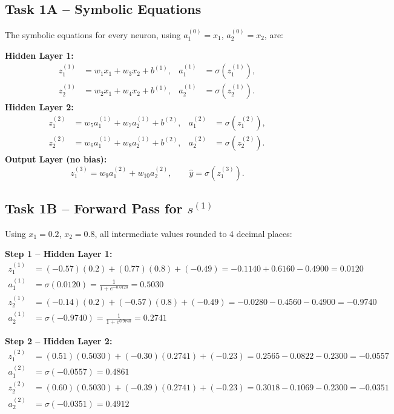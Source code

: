 \documentclass[runningheads]{llncs}
\begin{document}
\subsection{Task 1A -- Symbolic Equations}

The symbolic equations for every neuron, using $a_1^{(0)}=x_1$,
$a_2^{(0)}=x_2$, are:

\noindent\textbf{Hidden Layer 1:}
\begin{align*}
  z_1^{(1)} &= w_1 x_1 + w_3 x_2 + b^{(1)}, & a_1^{(1)} &= \sigma(z_1^{(1)}),\\
  z_2^{(1)} &= w_2 x_1 + w_4 x_2 + b^{(1)}, & a_2^{(1)} &= \sigma(z_2^{(1)}).
\end{align*}
\textbf{Hidden Layer 2:}
\begin{align*}
  z_1^{(2)} &= w_5 a_1^{(1)} + w_7 a_2^{(1)} + b^{(2)}, & a_1^{(2)} &= \sigma(z_1^{(2)}),\\
  z_2^{(2)} &= w_6 a_1^{(1)} + w_8 a_2^{(1)} + b^{(2)}, & a_2^{(2)} &= \sigma(z_2^{(2)}).
\end{align*}
\textbf{Output Layer (no bias):}
\begin{equation*}
  z_1^{(3)} = w_9 a_1^{(2)} + w_{10} a_2^{(2)}, \qquad \hat{y} = \sigma(z_1^{(3)}).
\end{equation*}

\subsection{Task 1B -- Forward Pass for $s^{(1)}$}

Using $x_1=0.2$, $x_2=0.8$, all intermediate values rounded to 4 decimal places:

\noindent\textbf{Step 1 -- Hidden Layer 1:}
\begin{align*}
  z_1^{(1)} &= (-0.57)(0.2)+(0.77)(0.8)+(-0.49) = -0.1140+0.6160-0.4900 = 0.0120\\
  a_1^{(1)} &= \sigma(0.0120) = \tfrac{1}{1+e^{-0.0120}} = 0.5030\\[4pt]
  z_2^{(1)} &= (-0.14)(0.2)+(-0.57)(0.8)+(-0.49) = -0.0280-0.4560-0.4900 = -0.9740\\
  a_2^{(1)} &= \sigma(-0.9740) = \tfrac{1}{1+e^{0.9740}} = 0.2741
\end{align*}

\noindent\textbf{Step 2 -- Hidden Layer 2:}
\begin{align*}
  z_1^{(2)} &= (0.51)(0.5030)+(-0.30)(0.2741)+(-0.23) = 0.2565-0.0822-0.2300 = -0.0557\\
  a_1^{(2)} &= \sigma(-0.0557) = 0.4861\\[4pt]
  z_2^{(2)} &= (0.60)(0.5030)+(-0.39)(0.2741)+(-0.23) = 0.3018-0.1069-0.2300 = -0.0351\\
  a_2^{(2)} &= \sigma(-0.0351) = 0.4912
\end{align*}
\end{document}
